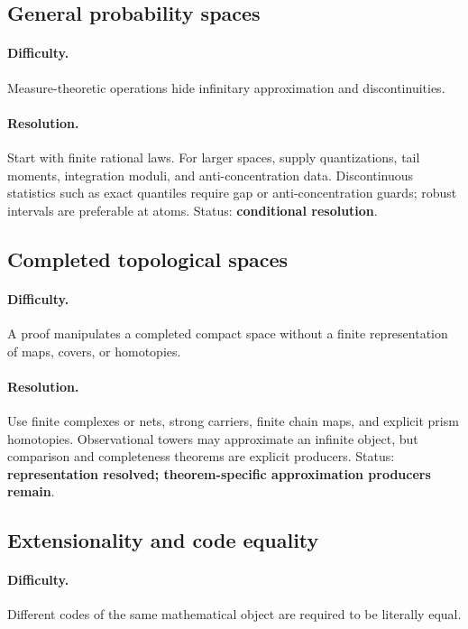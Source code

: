 \subsection{General probability spaces}

\paragraph{Difficulty.}
Measure-theoretic operations hide infinitary approximation and discontinuities.

\paragraph{Resolution.}
Start with finite rational laws.  For larger spaces, supply quantizations, tail moments, integration moduli, and anti-concentration data.  Discontinuous statistics such as exact quantiles require gap or anti-concentration guards; robust intervals are preferable at atoms.  Status: \textbf{conditional resolution}.

\subsection{Completed topological spaces}

\paragraph{Difficulty.}
A proof manipulates a completed compact space without a finite representation of maps, covers, or homotopies.

\paragraph{Resolution.}
Use finite complexes or nets, strong carriers, finite chain maps, and explicit prism homotopies.  Observational towers may approximate an infinite object, but comparison and completeness theorems are explicit producers.  Status: \textbf{representation resolved; theorem-specific approximation producers remain}.

\subsection{Extensionality and code equality}

\paragraph{Difficulty.}
Different codes of the same mathematical object are required to be literally equal.

